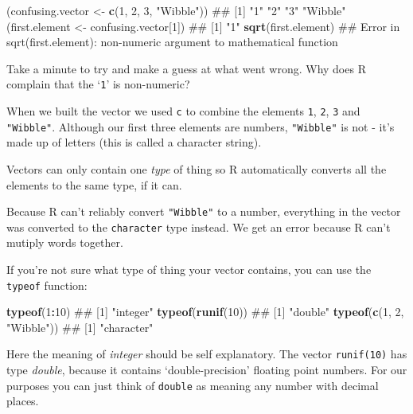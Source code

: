 \documentclass[]{article}
\newenvironment{Shaded}{\begin{snugshade}}{\end{snugshade}}
\newcommand{\KeywordTok}[1]{\textcolor[rgb]{0.13,0.29,0.53}{\textbf{#1}}}
\newcommand{\DecValTok}[1]{\textcolor[rgb]{0.00,0.00,0.81}{#1}}
\newcommand{\StringTok}[1]{\textcolor[rgb]{0.31,0.60,0.02}{#1}}
\newcommand{\OperatorTok}[1]{\textcolor[rgb]{0.81,0.36,0.00}{\textbf{#1}}}
\newcommand{\NormalTok}[1]{#1}
\theoremstyle{definition}
\theoremstyle{definition}
\theoremstyle{definition}
\theoremstyle{remark}
\begin{document}
\begin{Shaded}
\begin{Highlighting}[]
\NormalTok{(confusing.vector <-}\StringTok{ }\KeywordTok{c}\NormalTok{(}\DecValTok{1}\NormalTok{, }\DecValTok{2}\NormalTok{, }\DecValTok{3}\NormalTok{, }\StringTok{"Wibble"}\NormalTok{))}
\NormalTok{## [1] "1"      "2"      "3"      "Wibble"}
\NormalTok{(first.element <-}\StringTok{ }\NormalTok{confusing.vector[}\DecValTok{1}\NormalTok{])}
\NormalTok{## [1] "1"}
\KeywordTok{sqrt}\NormalTok{(first.element)}
\NormalTok{## Error in sqrt(first.element): non-numeric argument to mathematical function}
\end{Highlighting}
\end{Shaded}

Take a minute to try and make a guess at what went wrong. Why does R
complain that the `\texttt{1}' is non-numeric?

When we built the vector we used \texttt{c} to combine the elements
\texttt{1}, \texttt{2}, \texttt{3} and \texttt{"Wibble"}. Although our
first three elements are numbers, \texttt{"Wibble"} is not - it's made
up of letters (this is called a character string).

Vectors can only contain one \emph{type} of thing so R automatically
converts all the elements to the same type, if it can.

Because R can't reliably convert \texttt{"Wibble"} to a number,
everything in the vector was converted to the \texttt{character} type
instead. We get an error because R can't mutiply words together.

If you're not sure what type of thing your vector contains, you can use
the \texttt{typeof} function:

\begin{Shaded}
\begin{Highlighting}[]
\KeywordTok{typeof}\NormalTok{(}\DecValTok{1}\OperatorTok{:}\DecValTok{10}\NormalTok{)}
\NormalTok{## [1] "integer"}
\KeywordTok{typeof}\NormalTok{(}\KeywordTok{runif}\NormalTok{(}\DecValTok{10}\NormalTok{))}
\NormalTok{## [1] "double"}
\KeywordTok{typeof}\NormalTok{(}\KeywordTok{c}\NormalTok{(}\DecValTok{1}\NormalTok{, }\DecValTok{2}\NormalTok{, }\StringTok{"Wibble"}\NormalTok{))}
\NormalTok{## [1] "character"}
\end{Highlighting}
\end{Shaded}

Here the meaning of \emph{integer} should be self explanatory. The
vector \texttt{runif(10)} has type \emph{double}, because it contains
`double-precision' floating point numbers. For our purposes you can just
think of \texttt{double} as meaning any number with decimal places.
\end{document}
